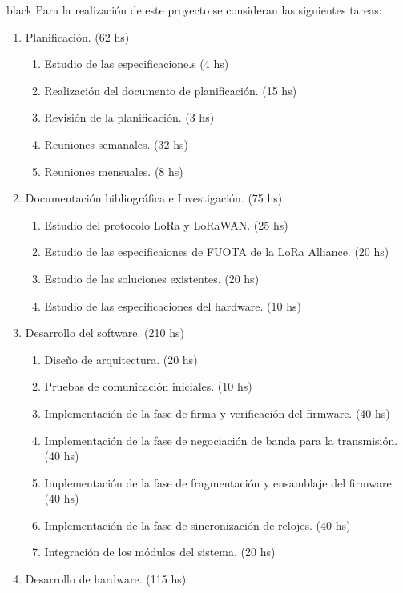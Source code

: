 \documentclass[11pt]{charter}
\begin{document}
\begin{consigna}{black}
Para la realización de este proyecto se consideran las siguientes tareas:

\begin{enumerate}
	\item Planificación. \hfill(62 hs)
	\begin{enumerate}
		\item Estudio de las especificacione.s \hfill(4 hs)
		\item Realización del documento de planificación. \hfill(15 hs)
		\item Revisión de la planificación. \hfill(3 hs)
		\item Reuniones semanales. \hfill(32 hs)
		\item Reuniones mensuales. \hfill(8 hs)
	\end{enumerate}
	\item Documentación bibliográfica e Investigación. (75 hs)
	\begin{enumerate}
		\item Estudio del protocolo LoRa y LoRaWAN. \hfill(25 hs)
		\item Estudio de las especificaiones de FUOTA de la LoRa Alliance\textregistered. \hfill(20 hs)
		\item Estudio de las soluciones existentes. \hfill(20 hs)
		\item Estudio de las especificaciones del hardware. \hfill(10 hs)
	\end{enumerate}
	\item Desarrollo del software. \hfill(210 hs)
	\begin{enumerate}
		\item Diseño de arquitectura. \hfill(20 hs)
		\item Pruebas de comunicación iniciales. \hfill(10 hs)
		\item Implementación de la fase de firma y verificación del firmware. \hfill(40 hs)
		\item Implementación de la fase de negociación de banda para la transmisión. \hfill(40 hs)
		\item Implementación de la fase de fragmentación y ensamblaje del firmware. \hfill(40 hs)
		\item Implementación de la fase de sincronización de relojes. \hfill(40 hs)
		\item Integración de los módulos del sistema. \hfill(20 hs)
	\end{enumerate}
    \item Desarrollo de hardware. \hfill(115 hs)

\end{enumerate}
\end{consigna}
\end{document}
